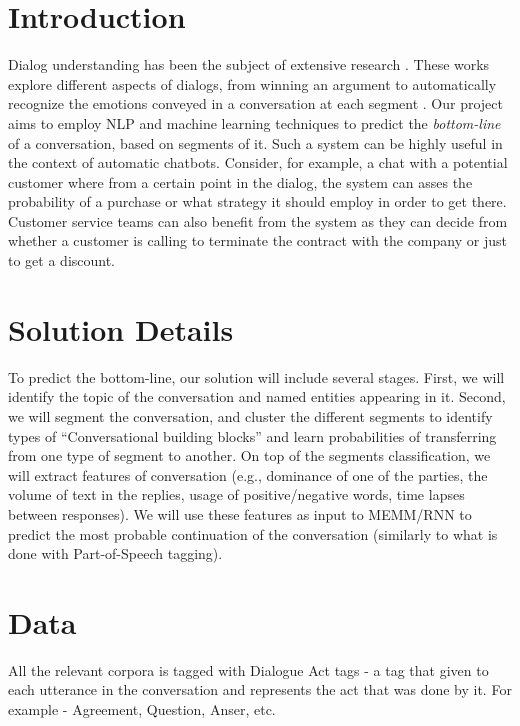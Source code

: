 \section{Introduction}
Dialog understanding has been the subject of 
extensive research \cite{BohusR03,BordesW16,GhazvininejadBC17,ShawarA03}. These works explore 
different aspects of dialogs, from winning an argument \cite{TanNDL16} 
to automatically recognize the emotions conveyed in a conversation at each segment \cite{AyadiKK11}. 
Our project aims to employ NLP and machine learning techniques to 
predict the {\em bottom-line} of a conversation, based on segments 
of it. Such a system can be highly useful in the context of automatic 
chatbots. Consider, for example, a chat with a potential customer where 
from a certain point in the dialog, the system can asses the probability of a purchase 
or what strategy it should employ in order to get there. 
Customer service teams can also benefit from the system as they can decide 
from whether a customer is calling to terminate the contract with the company 
or just to get a discount.

\section{Solution Details}
To predict the bottom-line, our solution will include several stages. 
First, we will identify the topic of the conversation and named entities 
appearing in it. Second, we will segment the conversation, 
and cluster the different segments to identify types of 
``Conversational building blocks'' and learn probabilities 
of transferring from one type of segment to another. 
On top of the segments classification, we will extract features of 
conversation (e.g., dominance of one of the parties, 
the volume of text in the replies, usage of positive/negative words, 
time lapses between responses). 
We will use these features as input to MEMM/RNN to predict the 
most probable continuation of the conversation 
(similarly to what is done with Part-of-Speech tagging). 


\section{Data}
All the relevant corpora is tagged with Dialogue Act tags - a tag that given to each utterance in the conversation and represents the act that was done by it. For example - Agreement, Question, Anser, etc.

